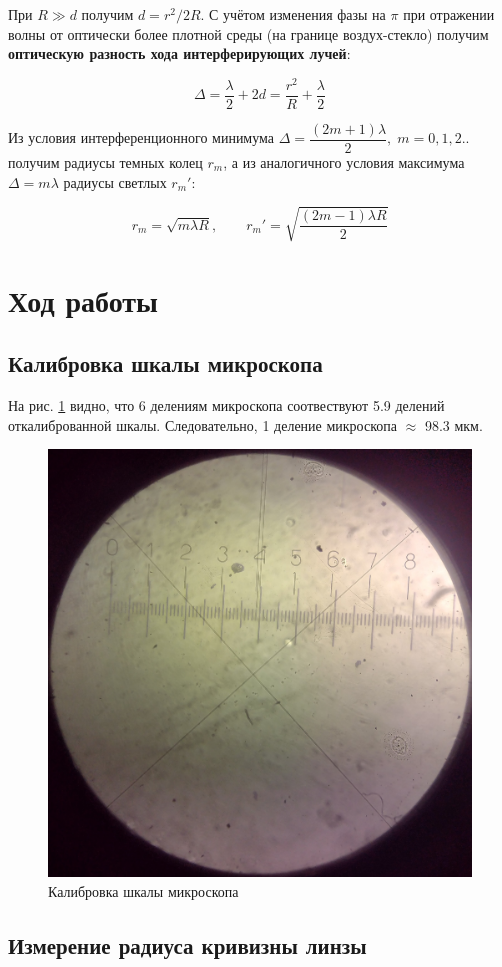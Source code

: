 \documentclass{article}
\begin{document}
	При $R\gg d$ получим $d = r^2/2R$. С учётом изменения фазы на $\pi$ при отражении волны от оптически более плотной среды (на границе воздух-стекло) получим \textbf{оптическую разность хода интерферирующих лучей}:
	
\begin{equation}\label{r_m}
    \Delta = \dfrac{\lambda}{2} + 2d = \dfrac{r^2}{R} + \dfrac{\lambda}{2}
\end{equation}
	
Из условия интерференционного минимума
$ \Delta = \dfrac{(2m +1)\lambda}{2}, \; m =0, 1, 2.. $ получим радиусы темных
колец $ r_m $, а из аналогичного условия максимума $ \Delta = m \lambda $
радиусы светлых $r_m'$:
	
\begin{equation}\label{r_m'}
    r_m = \sqrt{m \lambda R}, \qquad r_m' = \sqrt{\dfrac{(2m-1) \lambda R}{2}}
\end{equation}

\section{Ход работы}
\subsection{Калибровка шкалы микроскопа}
На рис. \ref{fig:calibration} видно, что 6 делениям микроскопа соотвествуют 5.9 делений
откалиброванной шкалы. Следовательно, 1 деление микроскопа $\approx$ 98.3 мкм.

\begin{figure}[h]
    \center\includegraphics[width = 0.3\linewidth]{calibration.jpg}
    \caption{Калибровка шкалы микроскопа}\label{fig:calibration}
\end{figure}

\subsection{Измерение радиуса кривизны линзы}
\end{document}
